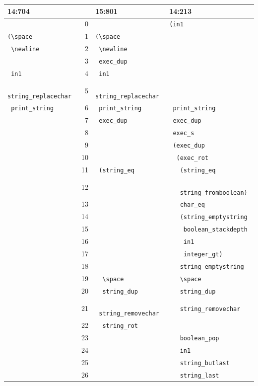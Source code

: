\begin{table}
\begin{tabular}{l|rl|l}
	\textbf{14:704} & & \textbf{15:801} & \textbf{14:213} \\
	\hline
& 0 & & \texttt{(in1} \\ 
\texttt{(\textbackslash space} & 1 & \texttt{(\textbackslash space} & \\ 
\texttt{ \textbackslash newline} & 2 & \texttt{ \textbackslash newline} &  \\ 
& 3 & \texttt{ exec\_dup} &  \\ 
\texttt{ in1} & 4 & \texttt{ in1} &  \\ 
\texttt{ string\_replacechar} & 5 & \texttt{ string\_replacechar} &  \\ 
\texttt{ print\_string} & 6 & \texttt{ print\_string} & \texttt{ print\_string} \\ 
& 7 & \texttt{ exec\_dup} & \texttt{ exec\_dup} \\ 
& 8 &  & \texttt{ exec\_s} \\ 
& 9 &  & \texttt{ (exec\_dup} \\ 
& 10 &  & \texttt{ \ (exec\_rot} \\ 
& 11 & \texttt{ (string\_eq} & \texttt{ \ \ (string\_eq} \\
& 12 & &  \texttt{ \ \ \ string\_fromboolean)} \\ 
& 13 &  & \texttt{ \ \ char\_eq} \\ 
& 14 & & \texttt{ \ \ (string\_emptystring} \\
& 15 & &  \texttt{ \ \ \ boolean\_stackdepth} \\
& 16 & & \texttt{ \ \ \ in1} \\
& 17 & & \texttt{ \ \ \ integer\_gt)} \\ 
& 18 &  & \texttt{ \ \ string\_emptystring} \\ 
& 19 & \texttt{ \ \textbackslash space} & \texttt{ \ \ \textbackslash space} \\ 
& 20 & \texttt{ \ string\_dup} & \texttt{ \ \ string\_dup} \\ 
& 21 & \texttt{ \ string\_removechar} & \texttt{ \ \ string\_removechar} \\
& 22 & \texttt{ \ string\_rot} & \\
& 23 & & \texttt{ \ \ boolean\_pop} \\ 
& 24 &   & \texttt{ \ \ in1} \\ 
& 25 &   & \texttt{ \ \ string\_butlast} \\ 
& 26 &   & \texttt{ \ \ string\_last} \\ 

\end{tabular}
\end{table}
